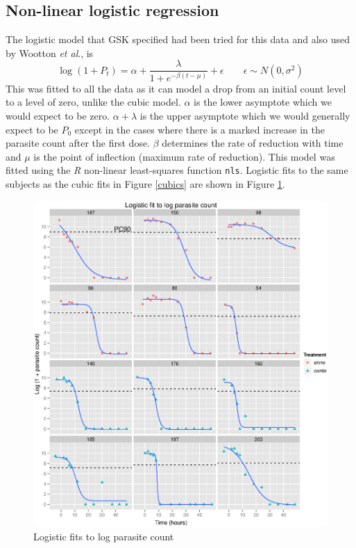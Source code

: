 \subsection{Non-linear logistic regression}
The logistic model that GSK specified had been tried for this data and also used by Wootton \textit{et al}.\cite{wootton}, is
$$\log(1+P_t)=\alpha+\frac{\lambda}{1+e^{-\beta(t-\mu)}}+\epsilon\quad\quad\epsilon\sim N(0,\sigma^2)$$
This was fitted to all the data as it can model a drop from an initial count level to a level of zero, unlike the cubic model. $\alpha$ is the lower asymptote which we would expect to be zero. $\alpha+\lambda$ is the upper asymptote which we would generally expect to be $P_0$ except in the cases where there is a marked increase in the parasite count after the first dose. $\beta$ determines the rate of reduction with time and $\mu$ is the point of inflection (maximum rate of reduction). This model was fitted using the \emph{R} non-linear least-squares function \texttt{nls}\cite{R}. Logistic fits to the same subjects as the cubic fits in Figure \ref{cubics} are shown in Figure \ref{logistics}.
\begin{figure}[h]
\includegraphics[width=150mm]{logistics.eps} 
\caption{Logistic fits to log parasite count}\label{logistics}
\end{figure}

